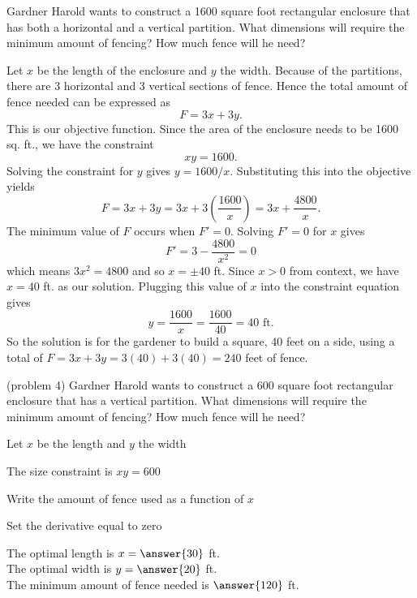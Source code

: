 \documentclass{ximera}
\begin{document}
\begin{example}[example 4]
Gardner Harold wants to construct a 1600 square foot  rectangular enclosure that has both a 
horizontal and a vertical partition. What dimensions will require the minimum amount of fencing?  
How much fence will he need?

\begin{center}
\end{center}

Let $x$ be the length of the enclosure and $y$ the width. Because of the partitions, there are 3 horizontal and 3 vertical sections of fence. Hence the total amount of fence needed can be expressed as 
\[F = 3x + 3y.\]
 This is our objective function. Since the area of the enclosure needs to be 1600 sq. ft., we have the constraint 
\[xy = 1600.\]
Solving the constraint for $y$ gives $y = 1600/x$.  Substituting this into the objective yields
\[F= 3x + 3y = 3x + 3\left(\frac{1600}{x}\right) = 3x + \frac{4800}{x}.\]
The minimum value of $F$ occurs when $F' = 0$. Solving $F' = 0$ for $x$ gives
\[F' = 3 - \frac{4800}{x^2} = 0\]
which means $3x^2 = 4800$ and so $x = \pm 40$ ft.  Since $x>0$ from context, we have $x = 40$ ft. as our solution.
Plugging this value of $x$ into the constraint equation gives
\[y = \frac{1600}{x} = \frac{1600}{40} = 40 \mbox{ ft.}\]
So the solution is for the gardener to build a square, 40 feet on a side, using a total of $F = 3x+ 3y = 3(40) + 3(40)
= 240$ feet of fence.
\end{example}

\begin{problem}(problem 4)
Gardner Harold wants to construct a 600 square foot  rectangular enclosure that has a 
vertical partition. What dimensions will require the minimum amount of fencing?  
How much fence will he need?

\begin{hint}
Let $x$ be the length and $y$ the width
\end{hint}
\begin{hint}
The size constraint is $xy = 600$
\end{hint}
\begin{hint}
Write the amount of fence used as a function of $x$
\end{hint}
\begin{hint}
Set the derivative equal to zero
\end{hint}

The optimal length is $x= \answer{30}$ ft.\\
The optimal width is $y = \answer{20}$ ft.\\
The minimum amount of fence needed is $\answer{120}$ ft.
\end{problem}
\end{document}
